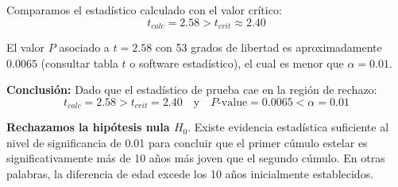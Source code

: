 \documentclass[12pt]{article}
\begin{document}
Comparamos el estadístico calculado con el valor crítico:
$$ t_{calc} = 2.58 > t_{crit} \approx 2.40 $$

El valor $P$ asociado a $t=2.58$ con 53 grados de libertad es aproximadamente $0.0065$ (consultar tabla $t$ o software estadístico), el cual es menor que $\alpha = 0.01$.

\textbf{Conclusión:} Dado que el estadístico de prueba cae en la región de rechazo:
$$t_{calc} = 2.58 > t_{crit} = 2.40 \quad \text{y} \quad P\text{-value} = 0.0065 < \alpha = 0.01$$

\textbf{Rechazamos la hipótesis nula $H_0$}. Existe evidencia estadística suficiente al nivel de significancia de 0.01 para concluir que el primer cúmulo estelar es significativamente más de 10 años más joven que el segundo cúmulo. En otras palabras, la diferencia de edad excede los 10 años inicialmente establecidos.
\end{document}
